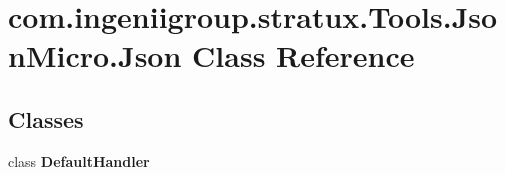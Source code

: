 \hypertarget{classcom_1_1ingeniigroup_1_1stratux_1_1_tools_1_1_json_micro_1_1_json}{}\section{com.\+ingeniigroup.\+stratux.\+Tools.\+Json\+Micro.\+Json Class Reference}
\label{classcom_1_1ingeniigroup_1_1stratux_1_1_tools_1_1_json_micro_1_1_json}
\subsection*{Classes}
\begin{DoxyCompactItemize}
\item 
class {\bfseries Default\+Handler}
\end{DoxyCompactItemize}

